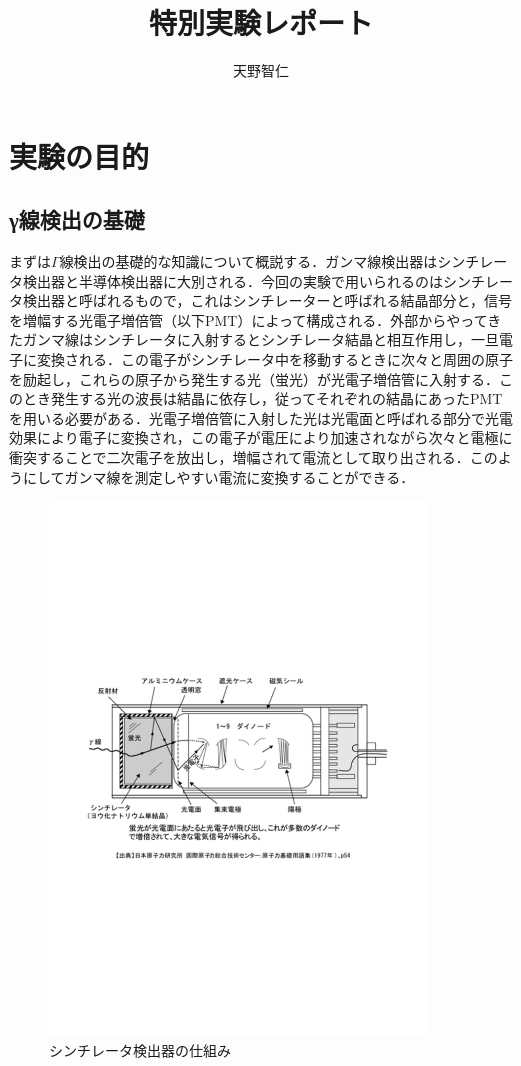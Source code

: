 \documentclass[a4j]{jarticle}
\title{特別実験レポート}
\author{天野智仁}
\date{}
\begin{document}
\maketitle
\newpage

\tableofcontents
\newpage
\section{実験の目的}
\subsection{γ線検出の基礎}
まずは$\Gamma$線検出の基礎的な知識について概説する．ガンマ線検出器はシンチレータ検出器と半導体検出器に大別される．今回の実験で用いられるのはシンチレータ検出器と呼ばれるもので，これはシンチレーターと呼ばれる結晶部分と，信号を増幅する光電子増倍管（以下PMT）によって構成される．外部からやってきたガンマ線はシンチレータに入射するとシンチレータ結晶と相互作用し，一旦電子に変換される．この電子がシンチレータ中を移動するときに次々と周囲の原子を励起し，これらの原子から発生する光（蛍光）が光電子増倍管に入射する．このとき発生する光の波長は結晶に依存し，従ってそれぞれの結晶にあったPMTを用いる必要がある．光電子増倍管に入射した光は光電面と呼ばれる部分で光電効果により電子に変換され，この電子が電圧により加速されながら次々と電極に衝突することで二次電子を放出し，増幅されて電流として取り出される．このようにしてガンマ線を測定しやすい電流に変換することができる．

\begin{figure}[htb]
 \centering
\includegraphics[bb=56 273 539 569,width=10cm]{scinti.pdf}
 \caption{シンチレータ検出器の仕組み}
 \label{031605_3Sep18}
\end{figure}
\end{document}
